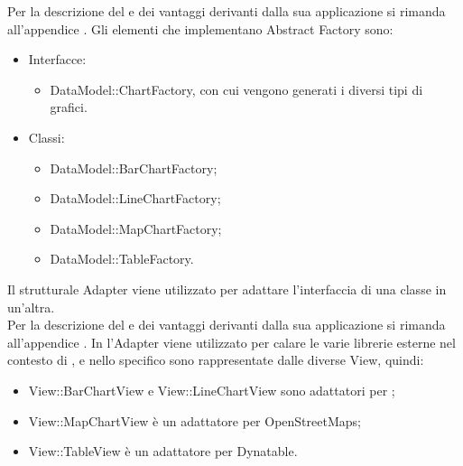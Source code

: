 	Per la descrizione del  e dei vantaggi derivanti dalla sua applicazione si rimanda all'appendice .
	Gli elementi che implementano Abstract Factory sono:
	\begin{itemize}
	\item Interfacce:
		\begin{itemize}
			\item DataModel::ChartFactory, con cui vengono generati i diversi tipi di grafici.
		\end{itemize}
	\item Classi:
		\begin{itemize}
			\item DataModel::BarChartFactory;
			\item DataModel::LineChartFactory;
			\item DataModel::MapChartFactory;
			\item DataModel::TableFactory.
		\end{itemize}
	\end{itemize}
	Il  strutturale Adapter viene utilizzato per adattare l'interfaccia di una classe in un'altra.\\
	Per la descrizione del  e dei vantaggi derivanti dalla sua applicazione si rimanda all'appendice .
	In  l'Adapter viene utilizzato per calare le varie librerie esterne nel contesto di \projectname{}, e nello specifico sono rappresentate dalle diverse View, quindi:
	\begin{itemize}
	\item View::BarChartView e View::LineChartView sono adattatori per ;
	\item View::MapChartView è un adattatore per OpenStreetMaps;
	\item View::TableView è un adattatore per Dynatable.
	\end{itemize}
	
